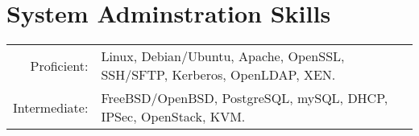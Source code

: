 \documentclass[lettersize,10pt]{article}
\begin{document}
\section{System Adminstration Skills}
\begin{tabular}{rl}
Proficient:& Linux, Debian/Ubuntu, Apache, OpenSSL, SSH/SFTP, Kerberos, OpenLDAP, XEN.\\
Intermediate:& FreeBSD/OpenBSD, PostgreSQL, mySQL, DHCP, IPSec, OpenStack, KVM.\\
\end{tabular}


\end{document}
